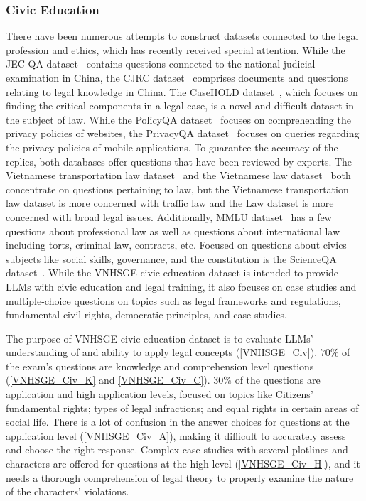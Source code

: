 \documentclass{article}
\begin{document}
{	\subsubsection{Civic Education}
	
	There have been numerous attempts to construct datasets connected to the legal profession and ethics, which has recently received special attention. While the JEC-QA dataset~\cite{zhong2020jec}  contains questions connected to the national judicial examination in China, the CJRC dataset~\cite{duan2019cjrc} comprises documents and questions relating to legal knowledge in China. The CaseHOLD dataset~\cite{zheng2021does}, which focuses on finding the critical components in a legal case, is a novel and difficult dataset in the subject of law. While the PolicyQA dataset~\cite{ravichander2019question} focuses on comprehending the privacy policies of websites, the PrivacyQA dataset~\cite{ahmad2020policyqa} focuses on queries regarding the privacy policies of mobile applications. To guarantee the accuracy of the replies, both databases offer questions that have been reviewed by experts. The Vietnamese transportation law dataset~\cite{bach2017question} and the Vietnamese law dataset~\cite{kien2020answering} both concentrate on questions pertaining to law, but the Vietnamese transportation law dataset is more concerned with traffic law and the Law dataset is more concerned with broad legal issues. Additionally, MMLU dataset~\cite{hendrycks2020measuring} has a few questions about professional law as well as questions about international law including torts, criminal law, contracts, etc. Focused on questions about civics subjects like social skills, governance, and the constitution is the ScienceQA dataset~\cite{lu2022learn}. While the VNHSGE civic education dataset is intended to provide LLMs with civic education and legal training, it also focuses on case studies and multiple-choice questions on topics such as legal frameworks and regulations, fundamental civil rights, democratic principles, and case studies.
	
	The purpose of VNHSGE civic education dataset is to evaluate LLMs' understanding of and ability to apply legal concepts (\ref{VNHSGE_Civ}). $70\%$ of the exam's questions are knowledge and comprehension level questions (\ref{VNHSGE_Civ_K} and \ref{VNHSGE_Civ_C}). $30\%$ of the questions are application and high application levels, focused on topics like Citizens' fundamental rights; types of legal infractions; and equal rights in certain areas of social life. There is a lot of confusion in the answer choices for questions at the application level (\ref{VNHSGE_Civ_A}), making it difficult to accurately assess and choose the right response. Complex case studies with several plotlines and characters are offered for questions at the high level (\ref{VNHSGE_Civ_H}), and it needs a thorough comprehension of legal theory to properly examine the nature of the characters' violations.
	
}
\end{document}
